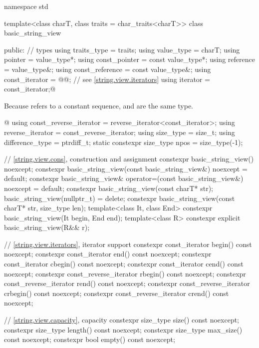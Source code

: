 \begin{codeblock}
namespace std {
  template<class charT, class traits = char_traits<charT>>
  class basic_string_view {
  public:
    // types
    using traits_type            = traits;
    using value_type             = charT;
    using pointer                = value_type*;
    using const_pointer          = const value_type*;
    using reference              = value_type&;
    using const_reference        = const value_type&;
    using const_iterator         = @@; // see \ref{string.view.iterators}
    using iterator               = const_iterator;@
\begin{footnote}
Because  refers to a constant sequence,  and  are the same type.
\end{footnote}@
    using const_reverse_iterator = reverse_iterator<const_iterator>;
    using reverse_iterator       = const_reverse_iterator;
    using size_type              = size_t;
    using difference_type        = ptrdiff_t;
    static constexpr size_type npos = size_type(-1);

    // \ref{string.view.cons}, construction and assignment
    constexpr basic_string_view() noexcept;
    constexpr basic_string_view(const basic_string_view&) noexcept = default;
    constexpr basic_string_view& operator=(const basic_string_view&) noexcept = default;
    constexpr basic_string_view(const charT* str);
    basic_string_view(nullptr_t) = delete;
    constexpr basic_string_view(const charT* str, size_type len);
    template<class It, class End>
      constexpr basic_string_view(It begin, End end);
    template<class R>
      constexpr explicit basic_string_view(R&& r);

    // \ref{string.view.iterators}, iterator support
    constexpr const_iterator begin() const noexcept;
    constexpr const_iterator end() const noexcept;
    constexpr const_iterator cbegin() const noexcept;
    constexpr const_iterator cend() const noexcept;
    constexpr const_reverse_iterator rbegin() const noexcept;
    constexpr const_reverse_iterator rend() const noexcept;
    constexpr const_reverse_iterator crbegin() const noexcept;
    constexpr const_reverse_iterator crend() const noexcept;

    // \ref{string.view.capacity}, capacity
    constexpr size_type size() const noexcept;
    constexpr size_type length() const noexcept;
    constexpr size_type max_size() const noexcept;
    constexpr bool empty() const noexcept;

}}
\end{codeblock}
